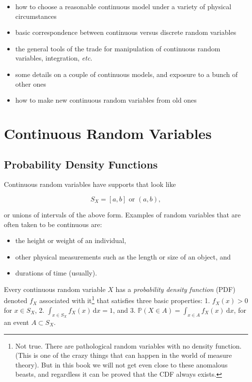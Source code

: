 \documentclass[]{book}
\providecommand{\tightlist}{%
  \setlength{\itemsep}{0pt}\setlength{\parskip}{0pt}}
\let\rmarkdownfootnote\footnote%
\def\footnote{\protect\rmarkdownfootnote}
\numberwithin{equation}{chapter}
\numberwithin{figure}{chapter}
\theoremstyle{plain}
\theoremstyle{definition}
\theoremstyle{remark}
\theoremstyle{definition}
\theoremstyle{definition}
\theoremstyle{remark}
\begin{document}
\begin{itemize}
\tightlist
\item
  how to choose a reasonable continuous model under a variety of
  physical circumstances
\item
  basic correspondence between continuous versus discrete random
  variables
\item
  the general tools of the trade for manipulation of continuous random
  variables, integration, \emph{etc}.
\item
  some details on a couple of continuous models, and exposure to a bunch
  of other ones
\item
  how to make new continuous random variables from old ones
\end{itemize}

\section{Continuous Random
Variables}\label{sec-continuous-random-variables}

\subsection{Probability Density
Functions}\label{sub-probability-density-functions}

Continuous random variables have supports that look like

\begin{equation}
S_{X}=[a,b]\mbox{ or }(a,b),
\end{equation}

or unions of intervals of the above form. Examples of random variables
that are often taken to be continuous are:

\begin{itemize}
\tightlist
\item
  the height or weight of an individual,
\item
  other physical measurements such as the length or size of an object,
  and
\item
  durations of time (usually).
\end{itemize}

Every continuous random variable \(X\) has a \emph{probability density
function} (PDF) denoted \(f_{X}\) associated with it\footnote{Not true.
  There are pathological random variables with no density function.
  (This is one of the crazy things that can happen in the world of
  measure theory). But in this book we will not get even close to these
  anomalous beasts, and regardless it can be proved that the CDF always
  exists.} that satisfies three basic properties: 1. \(f_{X}(x)>0\) for
\(x\in S_{X}\), 2. \(\int_{x\in S_{X}}f_{X}(x)\,\mathrm{d} x=1\), and 3.
\label{enu-contrvcond3}
\(\mathbb{P}(X\in A)=\int_{x\in  A}f_{X}(x)\:\mathrm{d} x\), for an
event \(A\subset S_{X}\).
\end{document}
